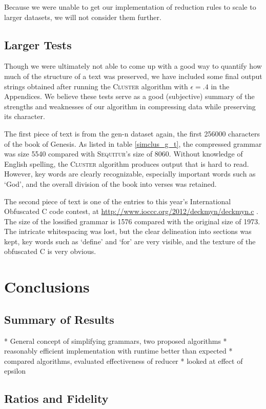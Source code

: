 \documentclass[11pt]{article}
\newcommand{\Sequitur}{\textsc{Sequitur}\xspace}
\newcommand{\Cluster}{\textsc{Cluster}\xspace}
\begin{document}
Because we were unable to get our implementation of
reduction rules to scale to larger datasets, we
will not consider them further.

\subsection{Larger Tests}

Though we were ultimately not able to come up with a good way to quantify how
much of the structure of a text was preserved, we have included some final
output strings obtained after running the \Cluster algorithm with $\epsilon
= .4$ in the Appendices. We believe these tests serve as a good (subjective)
summary of the strengths and weaknesses of our algorithm in compressing data
while preserving its character.

The first piece of text is from the gen-n dataset again, the first 256000
characters of the book of Genesis. As listed in table \ref{simclus_g_t}, the
compressed grammar was size 5540 compared with \Sequitur's size of 8060.
Without knowledge of English spelling, the \Cluster algorithm produces output
that is hard to read. However, key words are clearly recognizable, especially
important words such as `God', and the overall division of the book into
verses was retained.

The second piece of text is one of the entries to this year's International
Obfuscated C code contest, at \url{http://www.ioccc.org/2012/deckmyn/deckmyn.c}
.  The size of the lossified grammar is 1576 compared with the original size of
1973. The intricate whitespacing was lost, but the clear delineation into
sections was kept, key words such as `define' and `for' are very visible,
and the texture of the obfuscated C is very obvious.

\section{Conclusions}

\subsection{Summary of Results}

* General concept of simplifying grammars, two proposed algorithms
* reasonably efficient implementation with runtime better than expected
* compared algorithms, evaluated effectiveness of reducer
* looked at effect of epsilon

\subsection{Ratios and Fidelity}
\end{document}
